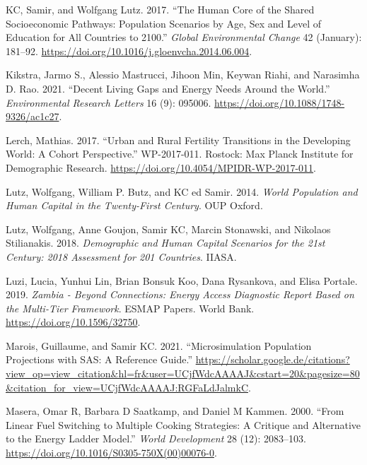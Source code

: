 \documentclass[
]{article}
\newlength{\cslhangindent}
\newlength{\cslentryspacingunit} %
\newenvironment{CSLReferences}[2] %
 {%
  \setlength{\parindent}{0pt}
  \ifodd #1
  \let\oldpar\par
  \def\par{\hangindent=\cslhangindent\oldpar}
  \fi
  \setlength{\parskip}{#2\cslentryspacingunit}
 }%
 {}
\begin{document}
\begin{CSLReferences}{1}{0}
\leavevmode{}%
KC, Samir, and Wolfgang Lutz. 2017. {``The Human Core of the Shared Socioeconomic Pathways: {Population} Scenarios by Age, Sex and Level of Education for All Countries to 2100.''} \emph{Global Environmental Change} 42 (January): 181--92. \url{https://doi.org/10.1016/j.gloenvcha.2014.06.004}.

\leavevmode{}%
Kikstra, Jarmo S., Alessio Mastrucci, Jihoon Min, Keywan Riahi, and Narasimha D. Rao. 2021. {``Decent Living Gaps and Energy Needs Around the World.''} \emph{Environmental Research Letters} 16 (9): 095006. \url{https://doi.org/10.1088/1748-9326/ac1c27}.

\leavevmode{}%
Lerch, Mathias. 2017. {``Urban and Rural Fertility Transitions in the Developing World: A Cohort Perspective.''} WP-2017-011. Rostock: Max Planck Institute for Demographic Research. \url{https://doi.org/10.4054/MPIDR-WP-2017-011}.

\leavevmode{}%
Lutz, Wolfgang, William P. Butz, and KC ed Samir. 2014. \emph{World Population and Human Capital in the Twenty-First Century}. OUP Oxford.

\leavevmode{}%
Lutz, Wolfgang, Anne Goujon, Samir KC, Marcin Stonawski, and Nikolaos Stilianakis. 2018. \emph{Demographic and Human Capital Scenarios for the 21st Century: 2018 Assessment for 201 Countries}. IIASA.

\leavevmode{}%
Luzi, Lucia, Yunhui Lin, Brian Bonsuk Koo, Dana Rysankova, and Elisa Portale. 2019. \emph{Zambia - {Beyond} {Connections}: {Energy} {Access} {Diagnostic} {Report} {Based} on the {Multi}-{Tier} {Framework}}. {ESMAP} Papers. World Bank. \url{https://doi.org/10.1596/32750}.

\leavevmode{}%
Marois, Guillaume, and Samir KC. 2021. {``‪{Microsimulation} {Population} {Projections} with {SAS}: {A} {Reference} {Guide}‬.''} \url{https://scholar.google.de/citations?view_op=view_citation\&hl=fr\&user=UCjfWdcAAAAJ\&cstart=20\&pagesize=80\&citation_for_view=UCjfWdcAAAAJ:RGFaLdJalmkC}.

\leavevmode{}%
Masera, Omar R, Barbara D Saatkamp, and Daniel M Kammen. 2000. {``From {Linear} {Fuel} {Switching} to {Multiple} {Cooking} {Strategies}: {A} {Critique} and {Alternative} to the {Energy} {Ladder} {Model}.''} \emph{World Development} 28 (12): 2083--103. \url{https://doi.org/10.1016/S0305-750X(00)00076-0}.


\end{CSLReferences}
\end{document}
